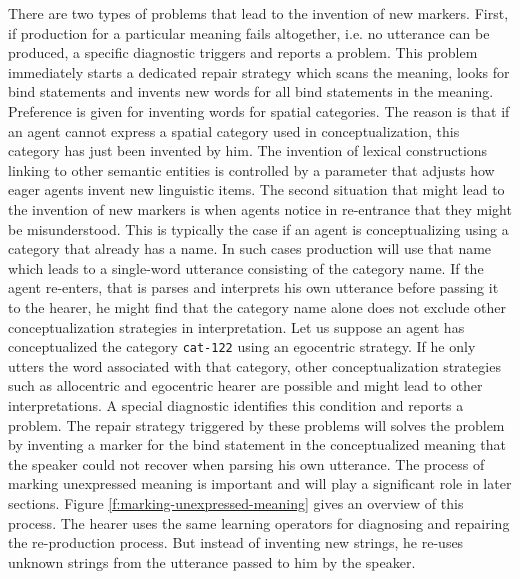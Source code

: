 There are two types of problems that lead to the invention of new markers. 
First, if production for a particular meaning fails altogether, i.e. no utterance can be 
produced, a specific diagnostic triggers and reports a problem. This problem immediately 
starts a dedicated repair strategy which scans the meaning, looks for bind statements and invents new words for all bind statements in the meaning. Preference is given for inventing words for spatial categories. The reason is that if an agent cannot express a spatial category used in conceptualization, this category has just been invented by him. 
The invention of lexical constructions linking to other semantic entities is controlled by
a parameter that adjusts how eager agents invent new linguistic items.
The second situation that might lead to the invention of new markers is when
agents notice in re-entrance that they might be misunderstood. This is typically
the case if an agent is conceptualizing using a category that already has a name.
In such cases production will use that name which leads to a single-word utterance consisting of the category name. If the agent re-enters, that is parses and interprets his 
own utterance before passing it to the hearer, he might find that the category name
alone does not exclude other conceptualization strategies in interpretation.
Let us suppose an agent has conceptualized the category {\footnotesize\tt cat-122} using
an egocentric strategy. If he only utters the word associated with that category, other
conceptualization strategies such as allocentric and egocentric hearer are possible
and might lead to other interpretations. A special diagnostic identifies this condition
and reports a problem. The repair strategy triggered by these problems will
solves the problem by inventing a marker for the bind statement in the conceptualized 
meaning that the speaker could not recover when parsing his own utterance.
The process of marking unexpressed meaning is important and will play a significant 
role in later sections. Figure \ref{f:marking-unexpressed-meaning} gives an overview of this process.
The hearer uses the same learning operators for diagnosing and repairing the re-production 
process. But instead of inventing new strings, he re-uses unknown strings from the
utterance passed to him by the speaker.


